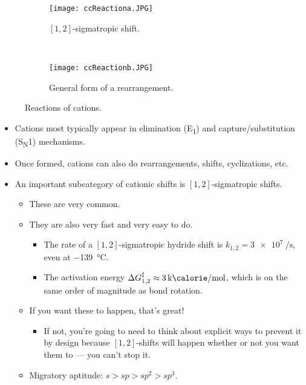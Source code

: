 \documentclass[../notes.tex]{subfiles}
\begin{document}
\begin{itemize}
\begin{figure}[H]
        \centering
        \begin{subfigure}[b]{\linewidth}
            \centering
            \texttt{[image: ccReactiona.JPG]}
            \caption{$[1,2]$-sigmatropic shift.}
            \label{fig:ccReactiona}
        \end{subfigure}\\[2em]
        \begin{subfigure}[b]{\linewidth}
            \centering
            \texttt{[image: ccReactionb.JPG]}
            \caption{General form of a rearrangement.}
            \label{fig:ccReactionb}
        \end{subfigure}
        \caption{Reactions of cations.}
        \label{fig:ccReaction}
    \end{figure}
    \begin{itemize}
        \item Cations most typically appear in elimination (E\textsubscript{1}) and capture/substitution (S\textsubscript{N}1) mechanisms.
        \item Once formed, cations can also do rearrangements, shifts, cyclizations, etc.
        \item An important subcategory of cationic shifts is $[1,2]$-sigmatropic shifts.
        \begin{itemize}
            \item These are very common.
            \item They are also very fast and very easy to do.
            \begin{itemize}
                \item The rate of a $[1,2]$-sigmatropic hydride shift is $k_{1,2}=\SI{3e7}{\per\second}$, even at \SI{-139}{\celsius}.
                \item The activation energy $\Delta G_{1,2}^\ddagger\approx\SI[per-mode=symbol]{3}{\kilo\calorie\per\mole}$, which is on the same order of magnitude as bond rotation.
            \end{itemize}
            \item If you want these to happen, that's great!
            \begin{itemize}
                \item If not, you're going to need to think about explicit ways to prevent it by design because $[1,2]$-shifts will happen whether or not you want them to --- you can't stop it.
            \end{itemize}
            \item Migratory aptitude: $s>sp>sp^2>sp^3$.

\end{itemize}
\end{itemize}
\end{itemize}
\end{document}
